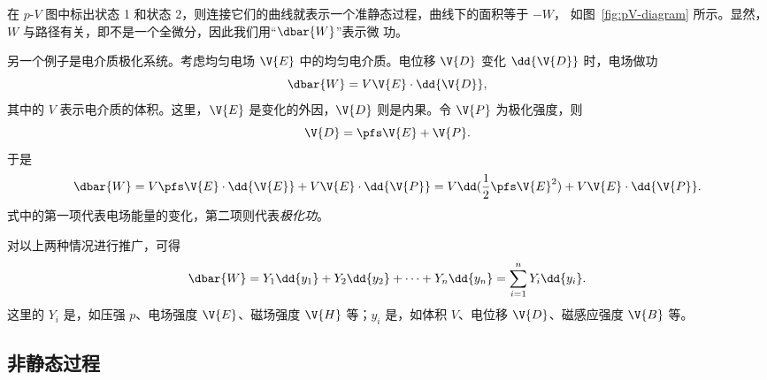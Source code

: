%     
%     
%     
%     
%     

在 $p$-$\!V$ 图中标出状态 1 和状态 2，则连接它们的曲线就表示一个准静态过程，曲线下的面积等于 $-W$，
如图~\ref{fig:pV-diagram} 所示。显然，$W$ 与路径有关，即不是一个全微分，因此我们用“$\dbar{W}$”表示微
功。

另一个例子是电介质极化系统。考虑均匀电场 $\V{E}$ 中的均匀电介质。电位移 $\V{D}$ 变化 $\dd{\V{D}}$
时，电场做功
\begin{equation}
  \dbar{W} = V \V{E} \cdot \dd{\V{D}},
\end{equation}
其中的 $V$ 表示电介质的体积。这里，$\V{E}$ 是变化的外因，$\V{D}$ 则是内果。令 $\V{P}$ 为极化强度，则
\begin{equation}
  \V{D} = \pfs \V{E} + \V{P}.
\end{equation}
于是
\begin{equation}
  \dbar{W} = V \pfs \V{E} \cdot \dd{\V{E}} + V \V{E} \cdot \dd{\V{P}}
  = V \dd(\frac{1}{2} \pfs \V{E}^2) + V \V{E} \cdot \dd{\V{P}}.
\end{equation}
式中的第一项代表电场能量的变化，第二项则代表\emph{极化功}。

对以上两种情况进行推广，可得
\begin{equation} \label{eq:work-general}
  \dbar{W} = Y_1 \dd{y_1} + Y_2 \dd{y_2} + \cdots + Y_n \dd{y_n}
  = \sum_{i=1}^{n} Y_i \dd{y_i}.
\end{equation}
这里的 $Y_i$ 是，如压强 $p$、电场强度 $\V{E}$、磁场强度 $\V{H}$ 等；$y_i$ 是，如体积 $V$、电位移 $\V{D}$、磁感应强度 $\V{B}$ 等。

\subsection{非静态过程}

